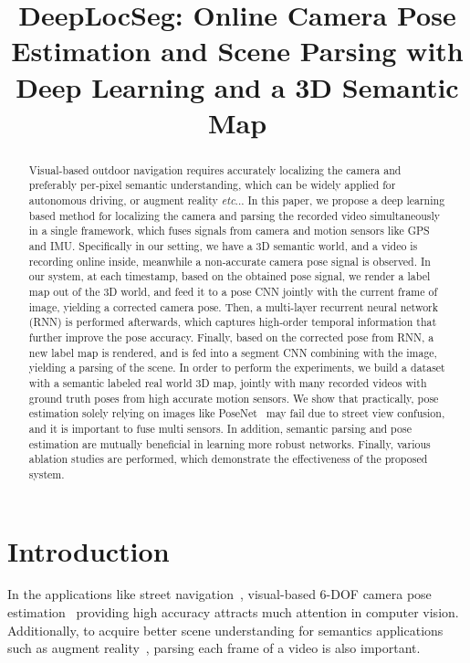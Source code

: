\documentclass[10pt,twocolumn,letterpaper]{article}
\makeatletter
\DeclareRobustCommand\onedot{\futurelet\@let@token\@onedot}
\def\onedot{\ifx\@let@token.\else.\null\fi\xspace}
\def\eg{\emph{e.g.}}
\def\etc{\emph{etc}\onedot}
\makeatother
\begin{document}
\title{DeepLocSeg: Online Camera Pose Estimation and Scene Parsing with Deep Learning and a 3D Semantic Map}

\maketitle

\begin{abstract}
Visual-based outdoor navigation requires accurately localizing the camera and preferably per-pixel semantic understanding, which can be widely applied for autonomous driving, or augment reality \etc.
In this paper, we propose a deep learning based method for localizing the camera and parsing the recorded video simultaneously in a single framework, which fuses signals from camera and motion sensors like GPS and IMU.
Specifically in our setting, we have a 3D semantic world, and a video is recording online inside, meanwhile a non-accurate camera pose signal is observed. 
In our system, at each timestamp, based on the obtained pose signal, we render a label map out of the 3D world, and feed it to a pose CNN jointly with the current frame of image, yielding a corrected camera pose. 
Then, a multi-layer recurrent neural network (RNN) is performed afterwards, which captures high-order temporal information that further improve the pose accuracy. 
Finally, based on the corrected pose from RNN, a new label map is rendered, and is fed into a segment CNN combining with the image, yielding a parsing of the scene.
In order to perform the experiments,  we build a dataset with a semantic labeled real world 3D map, jointly with many recorded videos with ground truth poses from high accurate motion sensors. 
We show that practically, pose estimation solely relying on images like PoseNet~\cite{Kendall_2015_ICCV} may fail due to street view confusion, and it is important to fuse multi sensors. In addition, semantic parsing and pose estimation are mutually beneficial in learning more robust networks. Finally, various ablation studies are performed, which demonstrate the effectiveness of the proposed system.
\end{abstract}

\section{Introduction}
\label{sec:introduction}
In the applications like street navigation~\cite{ohno2003outdoor}, visual-based 6-DOF camera pose estimation~\cite{campbell2017globally,moreno2008pose,Kendall_2015_ICCV,coskun2017long} providing high accuracy attracts much attention in computer vision. 
Additionally, to acquire better scene understanding for semantics applications such as augment reality~\cite{DBLP:journals/corr/abs-1708-05006}, parsing each frame of a video is also important. 
\end{document}
